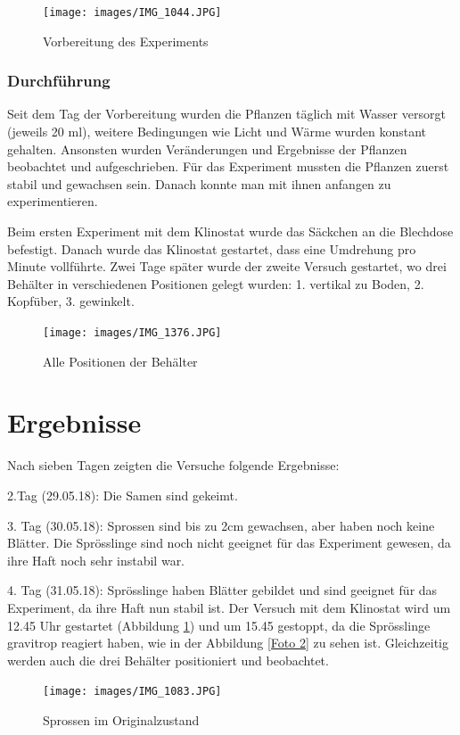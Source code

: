 \documentclass[
a4paper, 
11pt, 
ngerman,
listof=totoc,
bibliography=totocnumbered,
abstracton
]{scrreprt}
\begin{document}
\begin{figure}[H]
	\centering 
	\texttt{[image: images/IMG\_1044.JPG]}
	\caption{Vorbereitung des Experiments}
\end{figure}


\subsubsection{Durchführung}

Seit dem Tag der Vorbereitung wurden die Pflanzen täglich mit Wasser versorgt (jeweils 20 ml), weitere Bedingungen wie Licht und Wärme wurden konstant gehalten. Ansonsten wurden Veränderungen und Ergebnisse der Pflanzen beobachtet und aufgeschrieben.
Für das Experiment mussten die Pflanzen zuerst stabil und gewachsen sein. Danach konnte man mit ihnen anfangen zu experimentieren.

Beim ersten Experiment mit dem Klinostat wurde das Säckchen an die Blechdose befestigt. Danach wurde das Klinostat gestartet, dass eine Umdrehung pro Minute vollführte. Zwei Tage später wurde der zweite Versuch gestartet, wo drei Behälter in verschiedenen Positionen gelegt wurden: 1. vertikal zu Boden, 2. Kopfüber, 3. gewinkelt.


\begin{figure}[H]
	\centering 
	\texttt{[image: images/IMG\_1376.JPG]}
	\caption{Alle Positionen der Behälter}
\end{figure} 


\section{Ergebnisse}

Nach sieben Tagen zeigten die Versuche folgende Ergebnisse:

2.Tag (29.05.18): Die Samen sind gekeimt. 

3. Tag (30.05.18): Sprossen sind bis zu 2cm gewachsen, aber haben noch keine Blätter. Die Sprösslinge sind noch nicht geeignet für das Experiment gewesen, da ihre Haft noch sehr instabil war.

4. Tag (31.05.18): Sprösslinge haben Blätter gebildet und sind geeignet für das Experiment, da ihre Haft nun stabil ist. Der Versuch mit dem Klinostat wird um 12.45 Uhr gestartet (Abbildung \ref{Foto 1}) und um 15.45 gestoppt, da die Sprösslinge gravitrop reagiert haben, wie in der Abbildung \ref{Foto 2} zu sehen ist. Gleichzeitig werden auch die drei Behälter positioniert und beobachtet.

\begin{figure}[H]
	  \centering 
	  \texttt{[image: images/IMG\_1083.JPG]}
	  \caption{Sprossen im Originalzustand \label{Foto 1}}
\end{figure}
\end{document}
